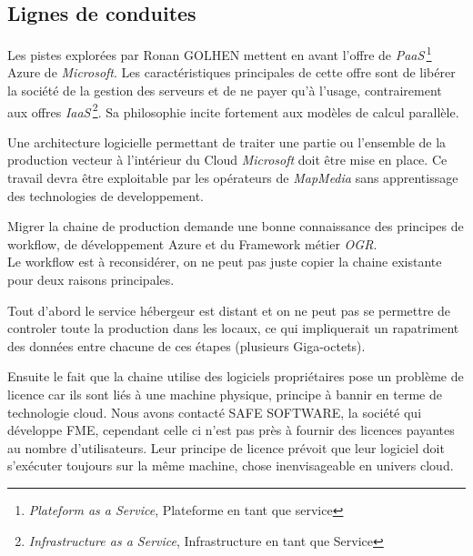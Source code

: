 %
%

\subsection{Lignes de conduites}

Les pistes explorées par Ronan GOLHEN mettent en avant l'offre de
\textit{PaaS}\,\footnote{\textit{Plateform as a Service}, Plateforme
  en tant que service} Azure de \textit{Microsoft}. Les
caractéristiques principales de cette offre sont de libérer la société
de la gestion des serveurs et de ne payer qu'à l'usage, contrairement
aux offres \textit{IaaS}\,\footnote{\textit{Infrastructure as a
    Service}, Infrastructure en tant que Service}. Sa philosophie
incite fortement aux modèles de calcul parallèle.


Une architecture logicielle permettant de traiter une partie ou
l'ensemble de la production vecteur à l'intérieur du Cloud
\textit{Microsoft} doit être mise en place. Ce travail devra être
exploitable par les opérateurs de \textit{MapMedia} sans apprentissage
des technologies de developpement.


Migrer la chaine de production demande une bonne connaissance des
principes de workflow, de développement Azure et du Framework métier
\textit{OGR}.\\

Le workflow est à reconsidérer, on ne peut pas juste copier la chaine
existante pour deux raisons principales.

Tout d'abord le service hébergeur est distant et on ne peut pas se
permettre de controler toute la production dans les locaux, ce qui
impliquerait un rapatriment des données entre chacune de ces étapes
(plusieurs Giga-octets). 

Ensuite le fait que la chaine utilise des logiciels propriétaires pose
un problème de licence car ils sont liés à une machine physique,
principe à bannir en terme de technologie cloud.  Nous avons contacté
SAFE SOFTWARE, la société qui développe FME, cependant celle ci n'est
pas près à fournir des licences payantes au nombre
d'utilisateurs. Leur principe de licence prévoit que leur logiciel
doit s'exécuter toujours sur la même machine, chose inenvisageable en
univers cloud.\\


